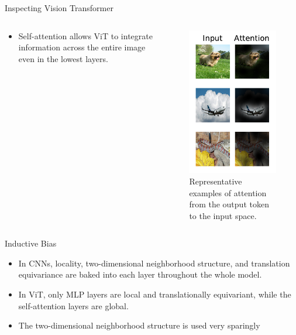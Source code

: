 \begin{frame}{Inspecting Vision Transformer}
    \begin{columns}
        \begin{column}{0.5\textwidth}
            \begin{itemize}
                \item Self-attention allows ViT to integrate information across the entire image even in the lowest layers.
            \end{itemize}
        \end{column}
        \begin{column}{0.5\textwidth}
            \begin{figure}
                \centering
                \includegraphics[height=0.75\textwidth]{pic/20201002_selected_attention_examples}
                \caption{Representative examples of attention from the output token to the input space.}
                \label{fig:inspecting-vit}
            \end{figure}
        \end{column}
    \end{columns}
\end{frame}

\begin{frame}{Inductive Bias}
    \begin{itemize}
        \item In CNNs, locality, two-dimensional neighborhood structure, and translation equivariance are baked into each layer throughout the whole model.
        \item In ViT, only MLP layers are local and translationally equivariant, while the self-attention layers are global.
        \item The two-dimensional neighborhood structure is used very sparingly
    \end{itemize}
\end{frame}
